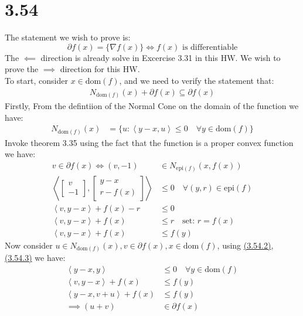 \documentclass[]{article}
\begin{document}
\section*{3.54}
    The statement we wish to prove is: 
    $$
        \partial f(x) = \{\nabla f(x)\} \iff f(x) \text{ is differentiable}
    $$
    The $\impliedby$ direction is already solve in Excercise 3.31 in this HW. We wish to prove the $\implies$ direction for this HW.
    \\
    To start, consider $x \in \text{dom}(f)$, and we need to verify the statement that: 
    \begin{align*}\tag{3.54.1}\label{eqn:3.54.1}
        N_{\text{dom}(f)}(x) + \partial f(x) \subseteq \partial f(x)
    \end{align*}
    Firstly, From the defintiion of the Normal Cone on the domain of the function we have: 
    \begin{align*}\tag{3.54.2}\label{eqn:3.54.2}
        N_{\text{dom}(f)} (x) &= \{
            u: \left\langle y - x, u \right\rangle \le 0 \quad \forall y \in \text{dom}(f)
        \}
    \end{align*}
    Invoke theorem 3.35 using the fact that the function is a proper convex function we have: 
    \begin{align*}\tag{3.54.3}\label{eqn:3.54.3}
        v \in \partial f(x) \iff (v, -1) &\in N_{\text{epi}(f)} (x, f(x)) 
        \\
        \left\langle 
            \begin{bmatrix}
                v \\ -1
            \end{bmatrix}, 
            \begin{bmatrix}
                y - x \\ r - f(x)
            \end{bmatrix}
        \right\rangle 
        &\le  0 \quad \forall (y,r) \in \text{epi}(f)
        \\
        \left\langle v, y - x \right\rangle + f(x) - r &\le 0
        \\
        \left\langle v, y - x \right\rangle + f(x) &\le r \quad \text{set: } r = f(x)
        \\
        \left\langle v, y - x \right\rangle + f(x) &\le f(y)
    \end{align*}
    Now consider $u \in N_{\text{dom}(f)}(x), v \in \partial f(x), x \in \text{dom}(f)$, using \hyperref[eqn:3.54.2]{(3.54.2)},\hyperref[eqn:3.54.3]{(3.54.3)} we have: 
    \begin{align*}\tag{3.54.4}\label{eqn:3.54.4}
        \left\langle y - x, y \right\rangle &\le 0 \quad \forall y \in \text{dom}(f)
        \\
        \left\langle v, y - x \right\rangle + f(x) & \le f(y)
        \\
        \left\langle y - x, v + u \right\rangle + f(x) &\le f(y)
        \\
        \implies (u + v) &\in \partial f(x)
    \end{align*}
\end{document}
